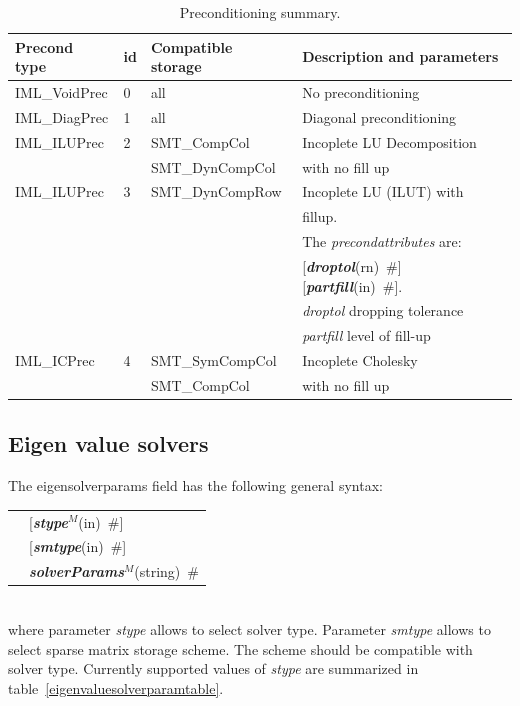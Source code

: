 \documentclass[a4paper]{article}
\makeatletter
\newcommand{\param}[1]{{\em #1}}
\newcommand{\keywordnotype}[1]{\mbox{{\it{\bf{#1}}}}}
\newcommand{\keyword}[2]{\mbox{{\keywordnotype{#1}\tiny (#2)}}}
\newcommand{\field}[2]{\mbox{\keyword{#1}{#2}~\#}}
\newcommand{\optField}[2]{\mbox{[\field{#1}{#2}]}}
\newenvironment{record}[1][]{\begin{tabular}{|ll}}{\end{tabular}\\}
\newcommand{\recentry}[2]{{#1}&{#2}\\}
\newcounter{rcc}
\newenvironment{record}[1][\textwidth]{\setcounter{rcc}{0}\begin{tabular*}{#1}{|ll@{\extracolsep{\fill}}r}}{\end{tabular*}\\}
\newcommand{\recentry}[2]{\ifthenelse{\value{rcc}>0}{&$\backslash$ \\}{\setcounter{rcc}{1}}{#1}&{#2}}
\makeatother
\begin{document}
\begin{table}[h]
\begin{center}
\begin{tabular}{|l|l|l|l|}
\hline
Precond type & id & Compatible storage & Description and parameters \\
\hline\hline
IML\_VoidPrec &0& all & No preconditioning\\
\hline
IML\_DiagPrec &1& all & Diagonal preconditioning\\
\hline
IML\_ILUPrec  &2& SMT\_CompCol & Incoplete LU Decomposition\\
              & & SMT\_DynCompCol&with no fill up\\
\hline
IML\_ILUPrec  &3& SMT\_DynCompRow & Incoplete LU (ILUT) with\\
              & &                 &  fillup. \\
              & &                 & The \param{precondattributes} are:\\
              & &                 & \optField{droptol}{rn}
\optField{partfill}{in}.\\
              & &                 & \param{droptol} dropping
tolerance\\
              & &                 & \param{partfill} level of
fill-up\\
\hline
IML\_ICPrec   &4& SMT\_SymCompCol&Incoplete Cholesky\\
              & & SMT\_CompCol   &with no fill up\\
\hline
\end{tabular}
\caption{Preconditioning summary.}
\label{precondtable}
\end{center}
\end{table}

\subsection{Eigen value solvers}
\label{eigensolverssection}
The eigensolverparams field has the following general syntax:\\
\begin{record}
\recentry{\hspace{20mm}}{\optField{stype$^M$}{in}} \recentry{}{\optField{smtype}{in}} \recentry{}{\field{solverParams$^M$}{string}}
\end{record}
where parameter \param{stype} allows to select solver type. Parameter \param{smtype} allows to select sparse matrix storage
scheme. The scheme should be compatible with solver type. Currently supported values of \param{stype} are summarized in table~\ref{eigenvaluesolverparamtable}.
\end{document}
